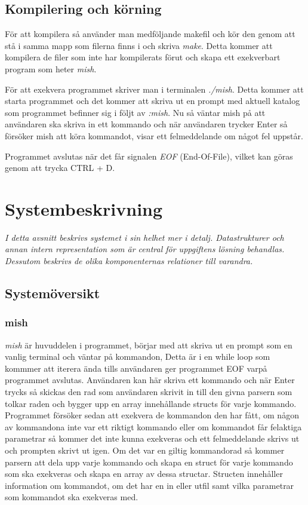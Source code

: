 \documentclass[11pt, titlepage, oneside, a4paper]{article}
\newcommand{\Section}[1]{\section{#1}\vspace{-8pt}}
\newcommand{\Subsection}[1]{\vspace{-4pt}\subsection{#1}\vspace{-8pt}}
\begin{document}
		\Subsection{Kompilering och körning}
		För att kompilera så använder man medföljande makefil och kör den genom att stå i samma mapp som filerna finns i och skriva
		\emph{make}. Detta kommer att kompilera de filer som inte har kompilerats förut och skapa ett exekverbart program som heter \emph{mish}.
		
		För att exekvera programmet skriver man i terminalen \emph{./mish}. Detta kommer att starta programmet och det kommer att skriva ut en prompt
		med aktuell katalog som programmet befinner sig i följt av \emph{:mish}. Nu så väntar mish på att användaren ska skriva in ett kommando och när användaren trycker Enter
		så försöker mish att köra kommandot, visar ett felmeddelande om något fel uppstår. 
		
		Programmet avslutas när det får signalen \emph{EOF} (End-Of-File), vilket kan göras genom att trycka CTRL + D.

	\Section{Systembeskrivning}
		\emph{I detta avsnitt beskrivs systemet i sin helhet mer i detalj.
			Datastrukturer och annan intern representation som är central
			för uppgiftens lösning behandlas. Dessutom beskrivs de olika
			komponenternas relationer till varandra.}
		
		
		\Subsection{Systemöversikt}
		\subsubsection{mish}
		\emph{mish} är huvuddelen i programmet, börjar med att skriva ut en prompt som en vanlig terminal och väntar på kommandon, Detta är i en while loop
		som kommmer att iterera ända tills användaren ger programmet EOF varpå programmet avslutas. Användaren kan här skriva ett kommando och när 
		Enter trycks så skickas den rad som användaren skrivit in till den givna parsern som tolkar raden och bygger upp en array innehållande structs för varje kommando.
		Programmet försöker sedan att exekvera de kommandon den har fått,
		om någon av kommandona inte var ett riktigt kommando eller om kommandot får felaktiga parametrar så kommer det inte kunna exekveras och ett felmeddelande
		skrivs ut och prompten skrivt ut igen. Om det var en giltig kommandorad så kommer parsern att dela upp varje kommando och skapa en struct för varje 
		kommando som ska exekveras och skapa en array av dessa structar. Structen innehåller information om kommandot, om det har en in eller utfil samt vilka parametrar som
		kommandot ska exekveras med. 
		
\end{document}

